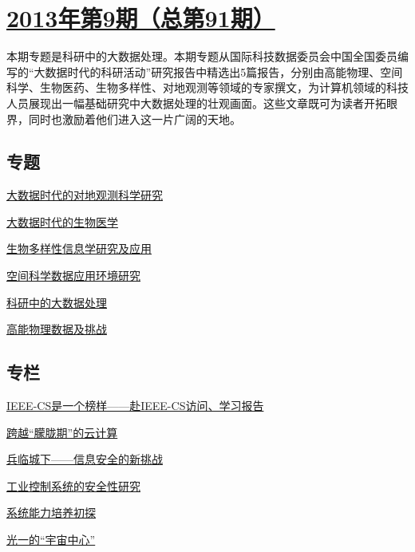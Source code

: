 \documentclass[a4paper]{article}
\begin{document}
\section{\href{http://history.ccf.org.cn/sites/ccf/jsjtbbd.jsp?contentId=2758898948684}{\textbf{2013年第9期（总第91期）}}}
本期专题是科研中的大数据处理。本期专题从国际科技数据委员会中国全国委员编写的“大数据时代的科研活动”研究报告中精选出5篇报告，分别由高能物理、空间科学、生物医药、生物多样性、对地观测等领域的专家撰文，为计算机领域的科技人员展现出一幅基础研究中大数据处理的壮观画面。这些文章既可为读者开拓眼界，同时也激励着他们进入这一片广阔的天地。
\subsection{专题}
\href{http://history.ccf.org.cn/resources/1190201776262/2013/09/18/5.pdf}{大数据时代的对地观测科学研究}

\href{http://history.ccf.org.cn/resources/1190201776262/2013/09/18/3.pdf}{大数据时代的生物医学}

\href{http://history.ccf.org.cn/resources/1190201776262/2013/09/18/4.pdf}{生物多样性信息学研究及应用}

\href{http://history.ccf.org.cn/resources/1190201776262/2013/09/18/2.pdf}{空间科学数据应用环境研究}

\href{http://history.ccf.org.cn/resources/1190201776262/2013/09/18/0.pdf}{科研中的大数据处理}

\href{http://history.ccf.org.cn/resources/1190201776262/2013/09/18/1.pdf}{高能物理数据及挑战}

\subsection{专栏}
\href{http://history.ccf.org.cn/resources/1190201776262/2013/09/18/12.pdf}{IEEE-CS是一个榜样——赴IEEE-CS访问、学习报告}

\href{http://history.ccf.org.cn/resources/1190201776262/2013/09/18/10.pdf}{跨越“朦胧期”的云计算}

\href{http://history.ccf.org.cn/resources/1190201776262/2013/09/18/6.pdf}{兵临城下——信息安全的新挑战}

\href{http://history.ccf.org.cn/resources/1190201776262/2013/09/18/7.pdf}{工业控制系统的安全性研究}

\href{http://history.ccf.org.cn/resources/1190201776262/2013/09/18/9.pdf}{系统能力培养初探}

\href{http://history.ccf.org.cn/resources/1190201776262/2013/09/18/11.pdf}{光一的“宇宙中心”}
\end{document}
